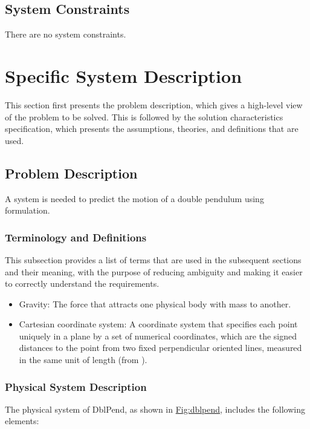\documentclass[12pt]{article}
\begin{document}
{\subsection{System Constraints}
\label{Sec:SysConstraints}
There are no system constraints.

\section{Specific System Description}
\label{Sec:SpecSystDesc}
This section first presents the problem description, which gives a high-level view of the problem to be solved. This is followed by the solution characteristics specification, which presents the assumptions, theories, and definitions that are used.

\subsection{Problem Description}
\label{Sec:ProbDesc}
A system is needed to predict the motion of a double pendulum using formulation.

\subsubsection{Terminology and Definitions}
\label{Sec:TermDefs}
This subsection provides a list of terms that are used in the subsequent sections and their meaning, with the purpose of reducing ambiguity and making it easier to correctly understand the requirements.

\begin{itemize}
\item{Gravity: The force that attracts one physical body with mass to another.}
\item{Cartesian coordinate system: A coordinate system that specifies each point uniquely in a plane by a set of numerical coordinates, which are the signed distances to the point from two fixed perpendicular oriented lines, measured in the same unit of length (from \cite{cartesianWiki}).}
\end{itemize}
\subsubsection{Physical System Description}
\label{Sec:PhysSyst}
The physical system of DblPend, as shown in \hyperref[Figure:dblpend]{Fig:dblpend}, includes the following elements:

}
\end{document}
